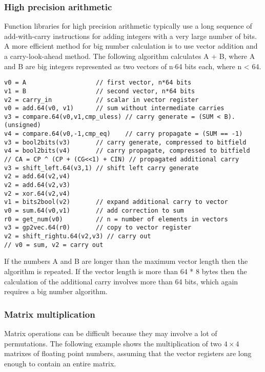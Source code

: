 \documentclass[forwardcom.tex]{subfiles}
\begin{document}
\subsubsection{High precision arithmetic} \label{highPrecisionArithmetic}
Function libraries for high precision arithmetic typically use a long sequence of add-with-carry instructions for adding integers with a very large number of bits. A more efficient method for big number calculation is to use vector addition and a carry-look-ahead method. The following algorithm calculates A + B, where A and B are big integers represented as two vectors of n$\cdot$64 bits each, where n \textless{} 64.
\vspace{2mm}

\begin{lstlisting}[frame=none]
v0 = A                   // first vector, n*64 bits
v1 = B                   // second vector, n*64 bits
v2 = carry_in            // scalar in vector register
v0 = add.64(v0, v1)      // sum without intermediate carries
v3 = compare.64(v0,v1,cmp_uless) // carry generate = (SUM < B). (unsigned)
v4 = compare.64(v0,-1,cmp_eq)    // carry propagate = (SUM == -1) 
v3 = bool2bits(v3)       // carry generate, compressed to bitfield
v4 = bool2bits(v4)       // carry propagate, compressed to bitfield
// CA = CP ^ (CP + (CG<<1) + CIN) // propagated additional carry
v3 = shift_left.64(v3,1) // shift left carry generate
v2 = add.64(v2,v4)
v2 = add.64(v2,v3)
v2 = xor.64(v2,v4)
v1 = bits2bool(v2)       // expand additional carry to vector
v0 = sum.64(v0,v1)       // add correction to sum
r0 = get_num(v0)         // n = number of elements in vectors
v3 = gp2vec.64(r0)       // copy to vector register
v2 = shift_rightu.64(v2,v3) // carry out
// v0 = sum, v2 = carry out
\end{lstlisting}
\vspace{2mm}

If the numbers A and B are longer than the maximum vector length then the algorithm is repeated. If the vector length is more than 64 * 8 bytes then the calculation of the additional carry involves more than 64 bits, which again requires a big number algorithm.

\subsubsection{Matrix multiplication} \label{matrixMultiplication}
Matrix operations can be difficult because they may involve a lot of permutations. The following example shows the multiplication of two $4\times4$ matrixes of floating point numbers, assuming that the vector registers are long enough to contain an entire matrix.
\end{document}
